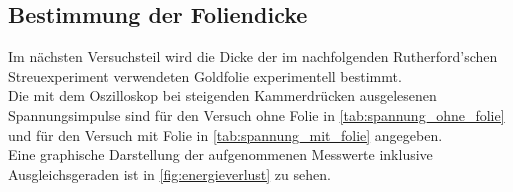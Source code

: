 \subsection{Bestimmung der Foliendicke}
\label{subsec:dicke}

Im nächsten Versuchsteil wird die Dicke der im nachfolgenden Rutherford'schen Streuexperiment verwendeten Goldfolie experimentell bestimmt.\\
Die mit dem Oszilloskop bei steigenden Kammerdrücken ausgelesenen Spannungsimpulse sind für den Versuch ohne Folie in \autoref{tab:spannung_ohne_folie} und für den Versuch mit Folie in \autoref{tab:spannung_mit_folie} angegeben.\\
Eine graphische Darstellung der aufgenommenen Messwerte inklusive Ausgleichsgeraden ist in \autoref{fig:energieverlust} zu sehen.\\



\begin{table}[htbp]
    \centering
    \caption{Spannungsimpulse in Abhängigkeit vom Kammerdruck ohne Folie.}
    \label{tab:spannung_ohne_folie}
\end{table}


\begin{table}[htbp]
    \centering
    \caption{Spannungsimpulse in Abhängigkeit vom Kammerdruck mit Folie.}
    \label{tab:spannung_mit_folie}
\end{table}

